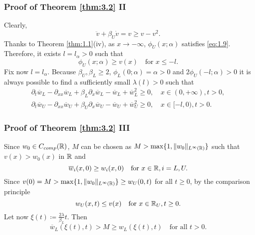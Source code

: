 \begin{frame}
    \frametitle{Proof of Theorem \ref{thm:3.2} II}
    \begin{proofc}
        Clearly,
        \[
            \ddot{v} + \beta_U \dot{v} = v \geq v - v^2.
        \]
        Thanks to Theorem \ref{thm:1.1}(iv), as \(x \to -\infty\), \(\phi_U(x; \alpha)\) satisfies \eqref{eq:1.9}. Therefore, it exists \(l = l_\alpha > 0\) such that
        \[
            \phi_U(x; \alpha) \geq v(x) \quad \text{for } x \leq -l.
        \]
        Fix now \(l = l_\alpha\). Because \(\beta_U, \beta_L \geq 2\), \(\phi_L(0;\alpha) = \alpha > 0\) and \(2\phi_U(-l;\alpha) > 0\) it is always possible to find a sufficiently small \(\lambda(l) > 0\) such that 
        \begin{align*}
            \partial_t \overline{w}_L - \partial_{xx} \overline{w}_L + \beta_L \partial_x \overline{w}_L - \overline{w}_L + \overline{w}_L^2 \geq 0, \quad x \in (0, +\infty), t > 0, \\
            \partial_t \overline{w}_U - \partial_{xx} \overline{w}_U + \beta_U \partial_x \overline{w}_U - \overline{w}_U + \overline{w}_U^2 \geq 0, \quad x \in [-l, 0), t > 0.
        \end{align*}
    \end{proofc}
\end{frame}


\begin{frame}
    \frametitle{Proof of Theorem \ref{thm:3.2} III}
    \begin{proofc}
        Since \(w_0 \in C_{comp}(\mathbb{R})\), \(M\) can be chosen as \(M > \max\{1, \lVert w_0\rVert_{L^{\infty}(\mathbb{R})}\}\) such that \(v(x) > w_0(x)\) in \(\mathbb{R}\) and 
        \[
            \overline{w}_i(x, 0) \geq w_i(x, 0) \quad \text{for } x \in \mathbb{R}, i = L, U.
        \] 
        Since \(v(0) = M > \max\{1, \lVert w_0\rVert_{L^{\infty}(\mathbb{R})}\} \geq w_U(0, t)\) for all \(t \geq 0\), by the comparison principle
        \[
            w_U(x, t) \leq v(x) \quad \text{for } x \in \mathbb{R}_U, t \geq 0.
        \]
        Let now \(\xi(t) \coloneqq \frac{2\lambda}{\beta_L} t\). Then 
        \[
            \overline{w}_L(\xi(t), t) > M \geq w_L(\xi(t), t) \quad \text{for all } t > 0.
        \]
    \end{proofc}
\end{frame}


